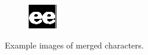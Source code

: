 \documentclass[english, paper=a4]{scrartcl}
\begin{document}
\begin{figure}[b!]
	\begin{subfigure}[t!]{0.25\textwidth}
		\includegraphics[width=\textwidth]{mergedChars3.png}
		\label{fig:ex2b}
	\end{subfigure}
	\caption{Example images of merged characters.}
	\label{fig:ex_proj_vert_char}
\end{figure}
\end{document}
